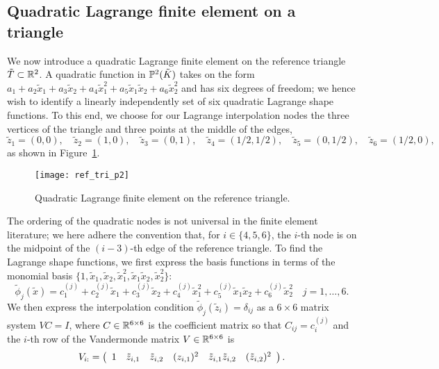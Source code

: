 \subsection{Quadratic Lagrange finite element on a triangle}
\label{sec:fe_p2_tri}
We now introduce a quadratic Lagrange finite element on the reference triangle $\tilde T \subset \RR^2$. A quadratic function in $\PP^2(\tilde K)$ takes on the form $a_1 + a_2 \tilde x_1 + a_3 \tilde x_2 + a_4 \tilde x_1^2 + a_5 \tilde x_1 \tilde x_2 + a_6 \tilde x_2^2$ and has six degrees of freedom; we hence wish to identify a linearly independently set of six quadratic Lagrange shape functions.  To this end, we choose for our Lagrange interpolation nodes the three vertices of the triangle and three points at the middle of the edges,
\begin{equation*}
  \tilde z_1 = (0,0), \quad \tilde z_2 = (1,0), \quad \tilde z_3 = (0,1), \quad \tilde z_4 = (1/2,1/2), \quad \tilde z_5 = (0,1/2), \quad \tilde z_6 = (1/2,0),
\end{equation*}
as shown in Figure~\ref{fig:fe_ref_tri_p2}.
\begin{figure}
  \centering
  \texttt{[image: ref\_tri\_p2]}
  \caption{Quadratic Lagrange finite element on the reference triangle.}
  \label{fig:fe_ref_tri_p2}
\end{figure}
The ordering of the quadratic nodes is not universal in the finite element literature; we here adhere the convention that, for $i \in \{4,5,6\}$, the $i$-th node is on the midpoint of the $(i-3)$-th edge of the reference triangle. To find the Lagrange shape functions, we first express the basis functions in terms of the monomial basis $\{1,\tilde x_1, \tilde x_2, \tilde x_1^2 , \tilde x_1 \tilde x_2, \tilde x_2^2\}$:
\begin{equation}
  \tilde \phi_j(\tilde x) = c_1^{(j)} + c_2^{(j)} \tilde x_1 + c_3^{(j)} \tilde x_2 + c_4^{(j)} \tilde x_1^2 + c_5^{(j)} \tilde x_1 \tilde x_2 + c_6^{(j)} \tilde x_2^2 \quad j = 1,\dots,6.
  \label{eq:fe_quad_tri_rep}
\end{equation}
We then express the interpolation condition $\tilde \phi_j(\tilde z_i) = \delta_{ij}$ as a $6 \times 6$ matrix system $VC = I$, where $C \in \RR^{6 \times 6}$ is the coefficient matrix so that $C_{ij} = c^{(j)}_i$ and the $i$-th row of the Vandermonde matrix $V \in \RR^{6 \times 6}$ is
\begin{equation*}
  V_{i:} = \bmat{cccccc} 1 & \tilde z_{i,1} & \tilde z_{i,2} &  (z_{i,1})^2 & \tilde z_{i,1} \tilde z_{i,2} & (\tilde z_{i,2})^2 \emat .
\end{equation*}
